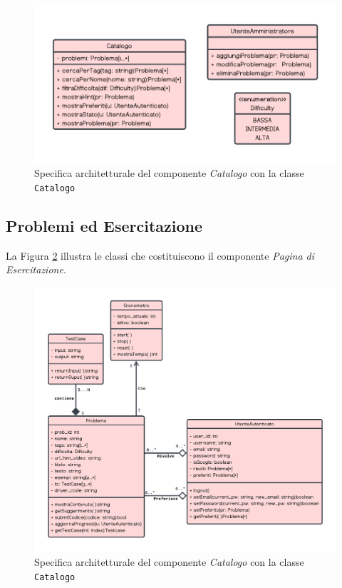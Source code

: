 \documentclass[11pt, a4paper]{article}
\theoremstyle{definition} %
\begin{document}
\begin{figure}[H]
\centering
\includegraphics[scale = 0.7]{materiale/class-catalogo.pdf}
\caption{Specifica architetturale del componente \textit{Catalogo} con la classe \texttt{Catalogo}}
\label{catalog}
\end{figure}



\newpage
\subsection{Problemi ed Esercitazione}
La Figura \ref{esercitaz} illustra le classi che costituiscono il componente
\textit{Pagina di Esercitazione}.

\begin{figure}[H]
\centering
\includegraphics[scale = 0.6]{materiale/class-esercitazione.pdf}
\caption{Specifica architetturale del componente \textit{Catalogo} con la classe \texttt{Catalogo}}
\label{esercitaz}
\end{figure}
\end{document}
